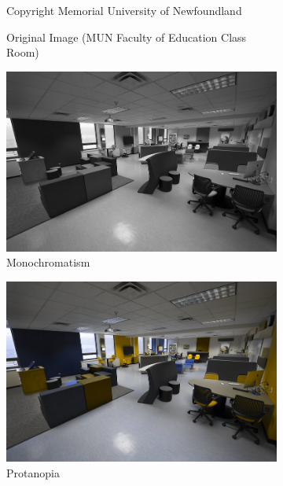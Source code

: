 \begin{figure}
\begin{subfigure}{.75\textwidth}
\scriptsize Copyright Memorial University of Newfoundland 
\caption{Original Image (MUN Faculty of Education Class Room)} 
\label{fig:cvd1}
\end{subfigure}
\hfill
\begin{subfigure}{.49\textwidth}
\centering
\includegraphics[width=\textwidth]{desaturate_photo.jpg}
\caption{Monochromatism} 
\label{fig:cvd2}
\end{subfigure}
\hfill
\begin{subfigure}{.49\textwidth}
\centering
\includegraphics[width=\textwidth]{protan_photo.jpg}
\caption{Protanopia} 
\label{fig:cvd3}
\end{subfigure}
\hfill
\begin{subfigure}{.49\textwidth}
\centering

\end{subfigure}
\end{figure}
